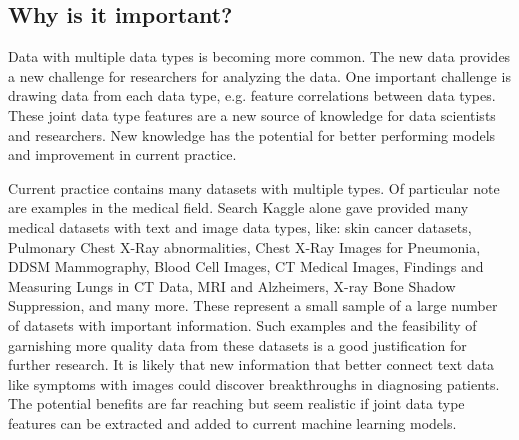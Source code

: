\subsection{Why is it important?}

Data with multiple data types is becoming more common.  The new data provides a new challenge for researchers for analyzing the data.  One important challenge is drawing data from each data type, e.g. feature correlations between data types.  These joint data type features are a new source of knowledge for data scientists and researchers.  New knowledge has the potential for better performing models and improvement in current practice.

Current practice contains many datasets with multiple types.  Of particular note are examples in the medical field.  Search Kaggle alone gave provided many medical datasets with text and image data types, like: skin cancer datasets, Pulmonary Chest X-Ray abnormalities, Chest X-Ray Images for Pneumonia, DDSM Mammography, Blood Cell Images, CT Medical Images, Findings and Measuring Lungs in CT Data, MRI and Alzheimers, X-ray Bone Shadow Suppression, and many more.  These represent a small sample of a large number of datasets with important information.  Such examples and the feasibility of garnishing more quality data from these datasets is a good justification for further research.  It is likely that new information that better connect text data like symptoms with images could discover breakthroughs in diagnosing patients.  The potential benefits are far reaching but seem realistic if joint data type features can be extracted and added to current machine learning models.


